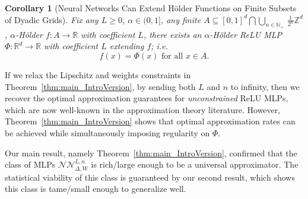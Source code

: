 \documentclass{article}
\numberwithin{equation}{section}
\newtheorem{corollary}{Corollary}[section]
\theoremstyle{definition}
\begin{document}
\begin{corollary}[Neural Networks Can Extend H\"{o}lder Functions on Finite Subsets of Dyadic Grids]
\label{cor:McShane__IntroVersion}
Fix any $L\ge 0$, $\alpha\in (0,1]$, any finite $A\subseteq [0,1]^d\bigcap \bigcup_{n \in \mathbb{N}_+}\, \frac1{2^n} \mathbb{Z}^d$, $\alpha$-H\"{o}lder $f:A\to \mathbb{R}$ with coefficient $L$, there exists an $\alpha$-H\"{o}lder ReLU MLP $\Phi:\mathbb{R}^d\to \mathbb{R}$ with coefficient $L$ extending $f$; i.e.\
\[
f(x)=\Phi(x) 
\mbox{ for all } x\in A
.
\]
\end{corollary}





If we relax the Lipschitz and weights constraints in Theorem~\ref{thm:main_IntroVersion}, by sending both $L$ and $n$ to infinity, then we recover the optimal approximation guarantees for \textit{unconstrained} ReLU MLPs, which are now well-known in the approximation theory literature.  However, Theorem~\ref{thm:main_IntroVersion} shows that optimal approximation rates can be achieved while simultaneously imposing regularity on $\Phi$.

Our main result, namely Theorem~\ref{thm:main_IntroVersion}, confirmed that the class of MLPs $\mathcal{NN}_{\Delta,W}^{L,n}$ is rich/large enough to be a universal approximator.  The statistical viability of this class is guaranteed by our second result, which shows this class is tame/small enough to generalize well.
% 
\end{document}
